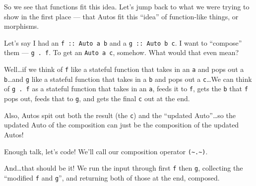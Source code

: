 \documentclass[]{article}
\newenvironment{Shaded}{}{}
\newcommand{\CommentTok}[1]{\textcolor[rgb]{0.38,0.63,0.69}{\textit{#1}}}
\newcommand{\DataTypeTok}[1]{\textcolor[rgb]{0.56,0.13,0.00}{#1}}
\newcommand{\KeywordTok}[1]{\textcolor[rgb]{0.00,0.44,0.13}{\textbf{#1}}}
\newcommand{\NormalTok}[1]{#1}
\newcommand{\OperatorTok}[1]{\textcolor[rgb]{0.40,0.40,0.40}{#1}}
\newcommand{\OtherTok}[1]{\textcolor[rgb]{0.00,0.44,0.13}{#1}}
\begin{document}
So we see that functions fit this idea. Let's jump back to what we were trying
to show in the first place --- that Autos fit this ``idea'' of function-like
things, or morphisms.

Let's say I had an \texttt{f\ ::\ Auto\ a\ b} and a \texttt{g\ ::\ Auto\ b\ c}.
I want to ``compose'' them --- \texttt{g\ .\ f}. To get an \texttt{Auto\ a\ c},
somehow. What would that even mean?

Well\ldots if we think of \texttt{f} like a stateful function that takes in an
\texttt{a} and pops out a \texttt{b}\ldots and \texttt{g} like a stateful
function that takes in a \texttt{b} and pops out a \texttt{c}\ldots We can think
of \texttt{g\ .\ f} as a stateful function that takes in an \texttt{a}, feeds it
to \texttt{f}, gets the \texttt{b} that \texttt{f} pops out, feeds that to
\texttt{g}, and gets the final \texttt{c} out at the end.

Also, Autos spit out both the result (the \texttt{c}) and the ``updated
Auto''\ldots so the updated Auto of the composition can just be the composition
of the updated Autos!

Enough talk, let's code! We'll call our composition operator
\texttt{(\textasciitilde{}.\textasciitilde{})}.

\begin{Shaded}
\end{Shaded}

And\ldots that should be it! We run the input through first \texttt{f} then
\texttt{g}, collecting the ``modified \texttt{f} and \texttt{g}'', and returning
both of those at the end, composed.
\end{document}

